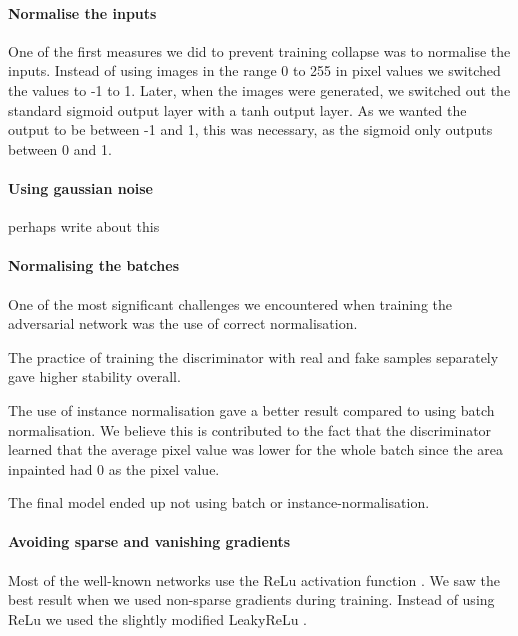 \paragraph{Normalise the inputs}
One of the first measures we did to prevent training collapse was to normalise the inputs. Instead of using images in the range 0 to 255 in pixel values we switched the values to  -1 to 1. 
Later, when the images were generated, we switched out the standard sigmoid output layer with a tanh output layer. As we wanted the output to be between -1 and 1, this was necessary, as the sigmoid only outputs between 0 and 1.

\paragraph{Using gaussian noise}
perhaps write about this



\paragraph{Normalising the batches}
One of the most significant challenges we encountered when training the adversarial network was the use of correct normalisation. 

The practice of training the discriminator with real and fake samples separately gave higher stability overall. 

The use of instance normalisation gave a better result compared to using batch normalisation. We believe this is contributed to the fact that the discriminator learned that the average pixel value was lower for the whole batch since the area inpainted had 0 as the pixel value.

The final model ended up not using batch or instance-normalisation. 



\paragraph{Avoiding sparse and vanishing gradients}
Most of the well-known networks use the ReLu\cite{Nair/2010/RLU/3104322.3104425} activation function \cite{DBLP:journals/corr/SimonyanZ14a} \cite{DBLP:journals/corr/SzegedyIV16} 
\cite{DBLP:journals/corr/HeZRS15}.
We saw the best result when we used non-sparse gradients during training. 
Instead of using ReLu we used the slightly modified LeakyReLu \cite{Maas2013RectifierNI}.


